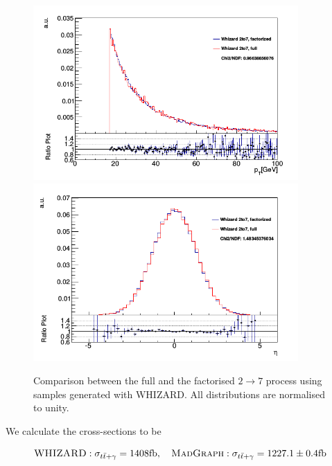 \begin{figure} 
\begin{center}
\includegraphics[width=0.9\textwidth]{Figures/WHIZARDfullvsfactorisedPT.png} \\
\includegraphics[width=0.9\textwidth]{Figures/WHIZARDfullvsfactorisedEta.png} \\
\end{center}
\caption{Comparison between the full and the factorised $2 \to 7$ process using samples generated with WHIZARD. All distributions are normalised to unity. \cite{ttgammasimulation}}
\label{fig-WHIZARDfullvsfactorised}
\end{figure}  

We calculate the cross-sections to be 

\begin{equation}
{\textsc{WHIZARD}} : \sigma_{t\bar{t}+\gamma} = 1408  \text{fb}, \quad \textsc{MadGraph} : \sigma_{t\bar{t}+\gamma} = 1227.1 \pm 0.4  \text{fb}
\end{equation}

